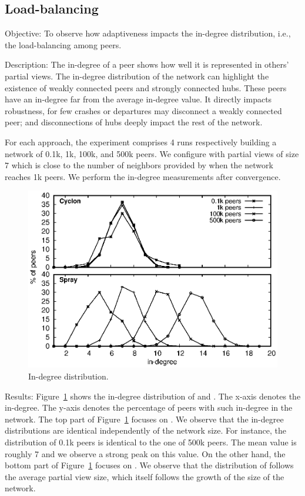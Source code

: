 \subsection{Load-balancing}

\begin{asparadesc}
\item[Objective:] To observe how adaptiveness impacts the in-degree
  distribution, i.e., the load-balancing among peers.
\item[Description:] The in-degree of a peer shows how well it is represented in
  others' partial views. The in-degree distribution of the network can highlight
  the existence of weakly connected peers and strongly connected hubs. These
  peers have an in-degree far from the average in-degree value. It directly
  impacts robustness, for few crashes or departures may disconnect a weakly
  connected peer; and disconnections of hubs deeply impact the rest of the
  network.

  For each approach, the experiment comprises 4 runs respectively building a
  network of 0.1k, 1k, 100k, and 500k peers. We configure \CYCLON with partial
  views of size $7$ which is close to the number of neighbors provided by \SPRAY
  when the network reaches 1k peers.  We perform the in-degree measurements
  after convergence.

\begin{figure}
  \centering
  \includegraphics[width=\SCALE\columnwidth]{img/histo.eps}
  \caption{\label{fig:histo}In-degree distribution.}
\end{figure}

\item[Results:] Figure~\ref{fig:histo} shows the in-degree distribution of
  \CYCLON and \SPRAY. The x-axis denotes the in-degree. The y-axis denotes the
  percentage of peers with such in-degree in the network. The top part of
  Figure~\ref{fig:histo} focuses on \CYCLON. We observe that the in-degree
  distributions are identical independently of the network size. For instance,
  the distribution of 0.1k peers is identical to the one of 500k peers. The mean
  value is roughly 7 and we observe a strong peak on this value. On the other
  hand, the bottom part of Figure~\ref{fig:histo} focuses on \SPRAY. We observe
  that the distribution of \SPRAY follows the average partial view size, which
  itself follows the growth of the size of the network.


\end{asparadesc}
